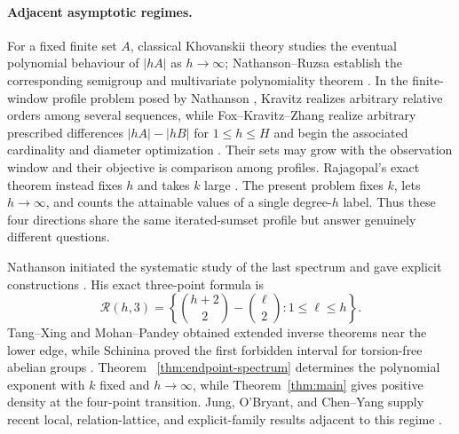 \documentclass[11pt,reqno]{amsart}
\theoremstyle{definition}
\theoremstyle{remark}
\newcommand{\Rcal}{\mathcal R}
\begin{document}
\paragraph{Adjacent asymptotic regimes.}
For a fixed finite set $A$, classical Khovanskii theory studies the eventual
polynomial behaviour of $|hA|$ as $h\to\infty$; Nathanson--Ruzsa establish
the corresponding semigroup and multivariate polynomiality theorem
\cite{NathansonRuzsa2002}.  In the finite-window profile problem posed by
Nathanson \cite{NathansonInverse2026}, Kravitz realizes arbitrary relative
orders among several sequences, while Fox--Kravitz--Zhang realize arbitrary prescribed differences
$|hA|-|hB|$ for $1\leq h\leq H$ and begin the associated cardinality and
diameter optimization \cite{Kravitz2025,FoxKravitzZhang2026}.  Their sets may
grow with the observation window and their objective is comparison among
profiles.  Rajagopal's exact theorem instead fixes $h$ and takes $k$ large
\cite{Rajagopal2026}.  The present problem fixes $k$, lets $h\to\infty$, and
counts the attainable values of a single degree-$h$ label.  Thus these four
directions share the same iterated-sumset profile but answer genuinely
different questions.

Nathanson initiated the systematic study of the last spectrum and gave
explicit constructions \cite{NathansonProblems,NathansonExplicit2025,
NathansonTriangular}.  His exact three-point formula is
\[
 \Rcal(h,3)=
 \left\{\binom{h+2}{2}-\binom{\ell}{2}:1\leq\ell\leq h\right\}.
\]
Tang--Xing and Mohan--Pandey obtained extended inverse theorems near the lower
edge, while Schinina proved the first forbidden interval for torsion-free
abelian groups
\cite{TangXing2021,MohanPandey2023,Schinina2026}.  Theorem~
\ref{thm:endpoint-spectrum} determines the polynomial exponent with $k$ fixed
and $h\to\infty$, while Theorem~\ref{thm:main} gives positive density at the
four-point transition.  Jung,
O'Bryant, and Chen--Yang supply recent local, relation-lattice, and
explicit-family results adjacent to this regime
\cite{Jung2026,OBryant2025,ChenYang2026}.
\end{document}
